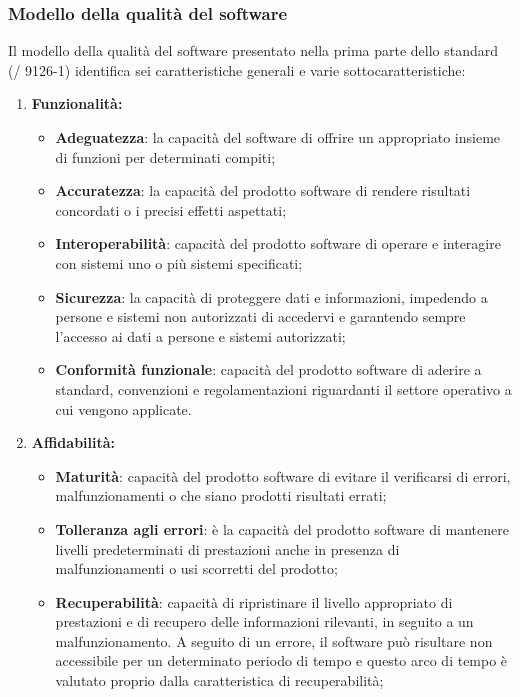   \subsubsection{Modello della qualità del software}
  Il modello della qualità del software presentato nella prima parte dello standard (/ 9126-1) identifica sei caratteristiche generali e varie sottocaratteristiche:
  \begin{enumerate}
    \item \textbf{Funzionalità:}
    \begin{itemize}
        \item \textbf{Adeguatezza}: la capacità del software di offrire un appropriato insieme di funzioni per determinati compiti;
        \item \textbf{Accuratezza}: la capacità del prodotto software di rendere risultati concordati o i precisi effetti aspettati;
        \item \textbf{Interoperabilità}: capacità del prodotto software di operare e interagire con sistemi uno o più sistemi specificati;
        \item \textbf{Sicurezza}: la capacità di proteggere dati e informazioni, impedendo a persone e sistemi non autorizzati di accedervi e garantendo sempre l'accesso ai dati a persone e sistemi autorizzati;
        \item \textbf{Conformità funzionale}: capacità del prodotto software di aderire a standard, convenzioni e regolamentazioni riguardanti il settore operativo a cui vengono applicate.
    \end{itemize}
    \item \textbf{Affidabilità:}
    \begin{itemize}
      \item \textbf{Maturità}: capacità del prodotto software di evitare il verificarsi di errori, malfunzionamenti o che siano prodotti risultati errati;
      \item \textbf{Tolleranza agli errori}: è la capacità del prodotto software di mantenere livelli predeterminati di prestazioni anche in presenza di malfunzionamenti o usi scorretti del prodotto;
      \item \textbf{Recuperabilità}: capacità di ripristinare il livello appropriato di prestazioni e di recupero delle informazioni rilevanti, in seguito a un malfunzionamento.
      A seguito di un errore, il software può risultare non accessibile per un determinato periodo di tempo e questo arco di tempo è valutato proprio dalla caratteristica di recuperabilità;

\end{itemize}
\end{enumerate}
